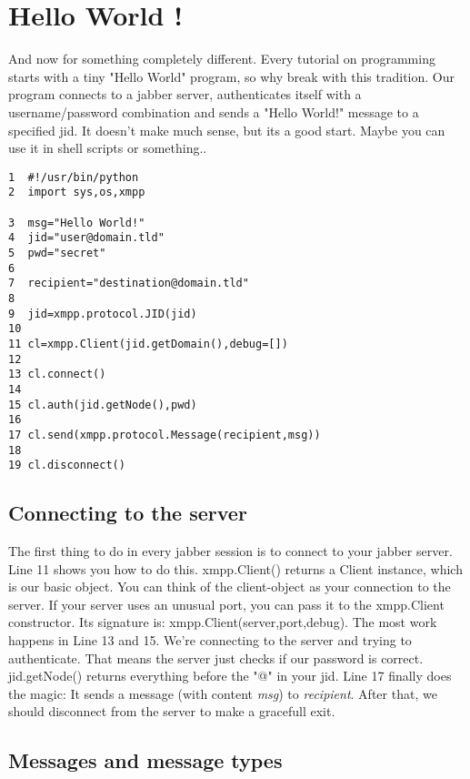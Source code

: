 \chapter{Hello World !}

And now for something completely different.
Every tutorial on programming starts with a tiny "Hello World" program, so why break with this tradition.
Our program connects to a jabber server, authenticates itself with a username/password combination and sends a "Hello
World!" message to a specified jid. It doesn't make much sense, but its a good start. Maybe you can use it  in shell scripts or something..

\begin{verbatim}
1  #!/usr/bin/python
2  import sys,os,xmpp

3  msg="Hello World!"
4  jid="user@domain.tld"
5  pwd="secret"
6
7  recipient="destination@domain.tld"
8
9  jid=xmpp.protocol.JID(jid)
10
11 cl=xmpp.Client(jid.getDomain(),debug=[])
12
13 cl.connect()
14
15 cl.auth(jid.getNode(),pwd)
16
17 cl.send(xmpp.protocol.Message(recipient,msg))
18
19 cl.disconnect()
\end{verbatim}
\newpage
\section{Connecting to the server}
The first thing to do in every jabber session is to connect to your jabber server.
Line 11 shows you how to do this. xmpp.Client() returns a Client instance, which is our basic object.
You can think of the client-object as your connection to the server. If your server uses an unusual port, you can pass it to the xmpp.Client constructor. Its signature is: xmpp.Client(server,port,debug).
\newline
\newline
The most work happens in Line 13 and 15. We're connecting to the server and trying to authenticate. That means the server just checks if our password is correct. jid.getNode() returns everything before the "@" in your jid.
\newline
\newline
Line 17 finally does the magic: It sends a message (with content \textit{msg}) to \textit{recipient}.
After that, we should disconnect from the server to make a gracefull exit.

\section{Messages and message types}

